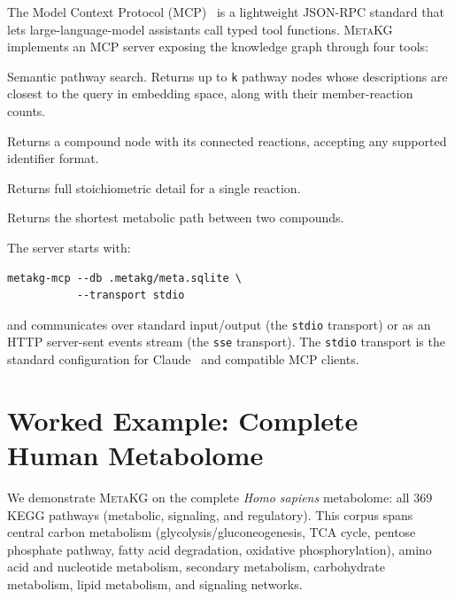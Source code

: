 \documentclass[10pt]{article}
\begin{document}
The Model Context Protocol (MCP)~\citep{anthropic2024mcp} is a lightweight
JSON-RPC standard that lets large-language-model assistants call typed tool
functions. \textsc{MetaKG} implements an MCP server exposing the knowledge
graph through four tools:

\begin{description}[leftmargin=*,itemsep=2pt]
  \item[\texttt{query\_pathway(name, k)}] Semantic pathway search. Returns
    up to \texttt{k} pathway nodes whose descriptions are closest to the
    query in embedding space, along with their member-reaction counts.
  \item[\texttt{get\_compound(id)}] Returns a compound node with its
    connected reactions, accepting any supported identifier format.
  \item[\texttt{get\_reaction(id)}] Returns full stoichiometric detail for
    a single reaction.
  \item[\texttt{find\_path(a, b, max\_hops)}] Returns the shortest metabolic
    path between two compounds.
\end{description}

The server starts with:

\begin{lstlisting}[style=bash]
metakg-mcp --db .metakg/meta.sqlite \
           --transport stdio
\end{lstlisting}

\noindent and communicates over standard input/output (the \texttt{stdio}
transport) or as an HTTP server-sent events stream (the \texttt{sse}
transport). The \texttt{stdio} transport is the standard configuration for
Claude~\citep{anthropic2024claude} and compatible MCP clients.

\section{Worked Example: Complete Human Metabolome}
\label{sec:usage}

We demonstrate \textsc{MetaKG} on the complete \textit{Homo sapiens}
metabolome: all 369 KEGG pathways (metabolic, signaling, and regulatory).
This corpus spans central carbon metabolism (glycolysis/gluconeogenesis, TCA
cycle, pentose phosphate pathway, fatty acid degradation, oxidative
phosphorylation), amino acid and nucleotide metabolism, secondary metabolism,
carbohydrate metabolism, lipid metabolism, and signaling networks.
\end{document}
